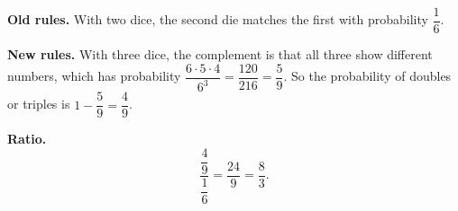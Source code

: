 \textbf{Old rules.} With two dice, the second die matches the first with probability $\dfrac{1}{6}$.

\textbf{New rules.} With three dice, the complement is that all three show different numbers, which has probability $\dfrac{6\cdot5\cdot4}{6^3}=\dfrac{120}{216}=\dfrac{5}{9}$. So the probability of doubles or triples is $1-\dfrac{5}{9}=\dfrac{4}{9}$.

\textbf{Ratio.}
\[\dfrac{\dfrac{4}{9}}{\dfrac{1}{6}}=\dfrac{24}{9}=\boxed{\dfrac{8}{3}}.\]
